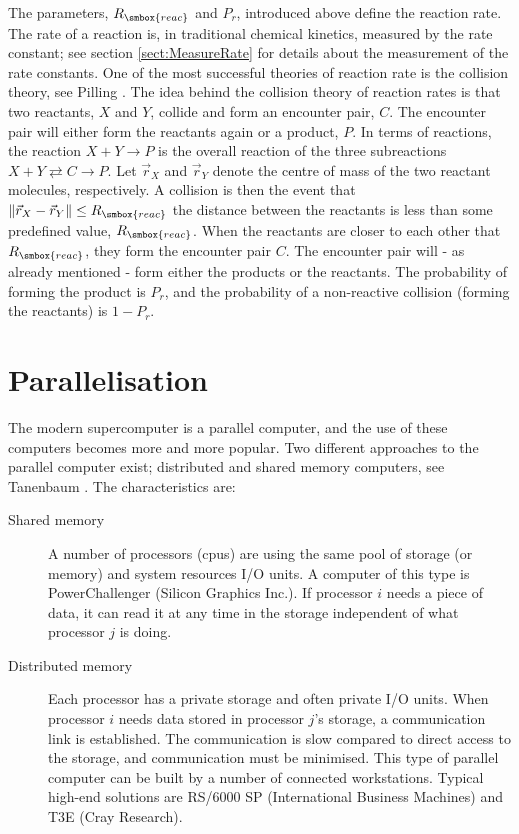 The parameters, $R_{\smbox{reac}}$ and $P_r$, introduced above define
the reaction rate. The rate of a reaction is, in traditional chemical
kinetics, measured by the rate constant; see section
\ref{sect:MeasureRate} for details about the measurement of the rate
constants. One of the most successful theories of reaction rate is the
collision theory, see \eg Pilling \etal \cite{Pilling95}. The idea
behind the collision theory of reaction rates is that two reactants,
$X$ and $Y$, collide and form an encounter pair, $C$. The encounter
pair will either form the reactants again or a product, $P$. In
terms of reactions, the reaction $X+Y \rightarrow P$ is the overall
reaction of the three subreactions $X+Y \rightleftarrows C \rightarrow
P$. Let $\vec{r}_X$ and $\vec{r}_Y$ denote the centre of mass of the two
reactant molecules, respectively. A collision is then the event that
$\|\vec{r}_X - \vec{r}_Y\| \le R_{\smbox{reac}}$ \ie the distance
between the reactants is less than some predefined value,
$R_{\smbox{reac}}$. When the reactants are closer to each other that 
$R_{\smbox{reac}}$, they form the encounter pair $C$. The encounter
pair will - as already mentioned - form either the products or the
reactants. The probability of forming the product is $P_r$, and the
probability of a non-reactive collision (forming the reactants) is
$1-P_r$.


\section{Parallelisation}
\label{sect:Parallel}
The modern supercomputer is a parallel computer, and the use of these
computers becomes more and more popular. Two different approaches to
the parallel computer exist; distributed and shared 
memory computers, see \eg Tanenbaum \cite{Tanenbaum90}. The
characteristics are: 

\begin{description}
\item[Shared memory] A number of processors (cpus) are using
  the same pool of storage (or memory) and system resources \eg I/O
  units. A computer of this type is PowerChallenger (Silicon
  Graphics Inc.). If processor $i$ needs a piece of data, it can read it at
  any time in the storage independent of what processor $j$ is doing. 
\item[Distributed memory] Each processor has a private storage and
  often private I/O units. When processor $i$ needs data stored in
  processor $j$'s storage, a communication link is established. The 
  communication is slow compared to direct access to the storage, and
  communication must be minimised. This type of parallel computer can
  be built by a number of connected workstations. Typical high-end
  solutions are RS/6000 SP (International Business Machines) and T3E
  (Cray Research). 
\end{description}

